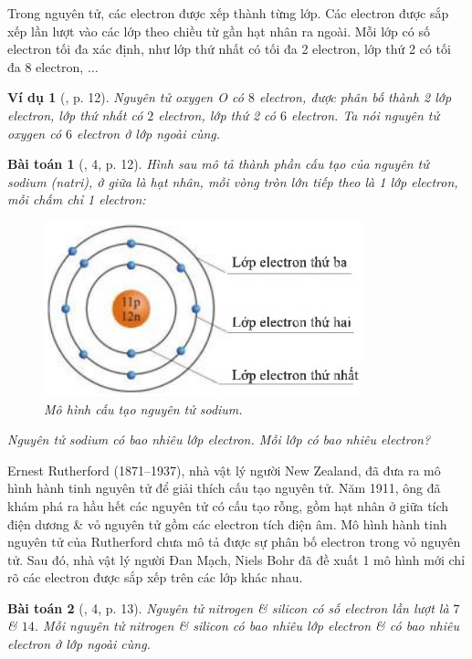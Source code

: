 \documentclass{article}
\newtheorem{baitoan}{Bài toán}
\newtheorem{vidu}{Ví dụ}
\begin{document}
Trong nguyên tử, các electron được xếp thành từng lớp. Các electron được sắp xếp lần lượt vào các lớp theo chiều từ gần hạt nhân ra ngoài. Mỗi lớp có số electron tối đa xác định, như lớp thứ nhất có tối đa 2 electron, lớp thứ 2 có tối đa 8 electron, $\ldots$

\begin{vidu}[\cite{SGK_KHTN_7_Canh_Dieu}, p. 12]
	Nguyên tử oxygen \emph{O} có $8$ electron, được phân bố thành 2 lớp electron, lớp thứ nhất có $2$ electron, lớp thứ 2 có $6$ electron. Ta nói nguyên tử oxygen có $6$ electron ở lớp ngoài cùng.
\end{vidu}

\begin{baitoan}[\cite{SGK_KHTN_7_Canh_Dieu}, 4, p. 12]
	Hình sau mô tả thành phần cấu tạo của nguyên tử sodium (natri), ở giữa là hạt nhân, mỗi vòng tròn lớn tiếp theo là 1 lớp electron, mỗi chấm chỉ 1 electron:
	\begin{figure}[H]
		\centering
		\includegraphics[scale=0.4]{sodium}
		\caption{Mô hình cấu tạo nguyên tử sodium.}
	\end{figure}
	\noindent Nguyên tử sodium có bao nhiêu lớp electron. Mỗi lớp có bao nhiêu electron?
\end{baitoan}
Ernest Rutherford (1871--1937), nhà vật lý người New Zealand, đã đưa ra mô hình hành tinh nguyên tử để giải thích cấu tạo nguyên tử. Năm 1911, ông đã khám phá ra hầu hết các nguyên tử có cấu tạo rỗng, gồm hạt nhân ở giữa tích điện dương \& vỏ nguyên tử gồm các electron tích điện âm. Mô hình hành tinh nguyên tử của Rutherford chưa mô tả được sự phân bố electron trong vỏ nguyên tử. Sau đó, nhà vật lý người Đan Mạch, Niels Bohr đã đề xuất 1 mô hình mới chỉ rõ các electron được sắp xếp trên các lớp khác nhau.

\begin{baitoan}[\cite{SGK_KHTN_7_Canh_Dieu}, 4, p. 13]
	Nguyên tử nitrogen \& silicon có số electron lần lượt là $7$ \& $14$. Mỗi nguyên tử nitrogen \& silicon có bao nhiêu lớp electron \& có bao nhiêu electron ở lớp ngoài cùng.
\end{baitoan}
\end{document}
